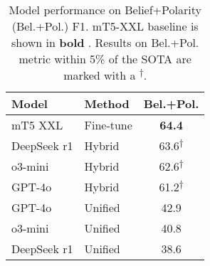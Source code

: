 
\begin{table}[t]
\setlength\tabcolsep{4pt}
\centering
\begin{tabular}{llc}
\toprule
\textbf{Model} & \textbf{Method} & \textbf{Bel.+Pol.} \\
\midrule
mT5 XXL      & Fine-tune & \textbf{64.4} \\
\midrule
DeepSeek r1  & Hybrid    & 63.6\textsuperscript{$\dagger$} \\
o3-mini      & Hybrid    & 62.6\textsuperscript{$\dagger$} \\
GPT-4o       & Hybrid    & 61.2\textsuperscript{$\dagger$} \\
\midrule
GPT-4o      & Unified      & 42.9 \\
o3-mini      & Unified      & 40.8 \\
DeepSeek r1  & Unified      & 38.6 \\
\bottomrule
\end{tabular}
\caption{Model performance on Belief+Polarity (Bel.+Pol.) F1. \citet{rovera-etal-2025-modafact} mT5-XXL baseline is shown in \textbf{bold} . Results on Bel.+Pol. metric within 5\% of the SOTA are marked with a \textsuperscript{$\dagger$}.}
\label{tab:moda-results}
\end{table}
